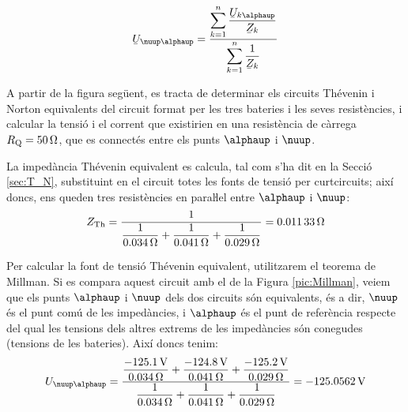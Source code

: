 \hfill
\begin{minipage}[b]{7cm}
    
    \label{pic:Millman}
\end{minipage}
\hfill
\begin{minipage}[b][4.5cm][t]{6cm}
    \begin{equation}
        \cmplx{U}_{\nuup\alphaup} = \frac{\displaystyle\sum_{k=1}^n \dfrac{\cmplx{U}_{k\alphaup}}{\cmplx{Z}_k}} {\displaystyle\sum_{k=1}^n \dfrac{1}{\cmplx{Z}_k}}
        \label{eq:millman}
    \end{equation}
\end{minipage}


\pagebreak

\begin{exemple}
    A partir de la figura següent, es tracta de determinar els circuits
    Thévenin i Norton equivalents del circuit format per les tres
    bateries i les seves resistències, i calcular la tensió i el
    corrent que existirien en una resistència de càrrega
    $R_\mathrm{Q}=\SI{50}{\ohm}$, que es connectés entre els punts $\alphaup$
    i $\nuup$.

    \begin{center}
        
    \end{center}

    La impedància Thévenin equivalent es calcula, tal com s'ha dit en la Secció \ref{sec:T_N},
    substituint en el circuit totes les fonts de tensió per curtcircuits; així doncs, ens
    queden tres resistències en paraŀlel entre $\alphaup$ i $\nuup$:
    \[
    Z_\mathrm{Th} = \frac{1}{\dfrac{1}{\SI{0,034}{\ohm}} +
    \dfrac{1}{\SI{0,041}{\ohm}} + \dfrac{1}{\SI{0,029}{\ohm}}} =
    \SI{0,01133}{\ohm}
    \]

    Per calcular la font de tensió Thévenin equivalent, utilitzarem el
    teorema de Millman. Si es compara aquest circuit amb el de la Figura
    \vref{pic:Millman}, veiem que els punts $\alphaup$ i $\nuup$ dels dos
    circuits són equivalents, és a dir, $\nuup$ és el punt comú de les
    impedàncies, i $\alphaup$ és el punt de referència respecte del qual les tensions  dels altres extrems de les impedàncies
    són conegudes
    (tensions de les bateries). Així doncs tenim:
    \[
    U_{\nuup\alphaup} = \frac{\dfrac{\SI{-125,1}{V}}{\SI{0,034}{\ohm}} +
    \dfrac{\SI{-124,8}{V}}{\SI{0,041}{\ohm}} +
    \dfrac{\SI{-125,2}{V}}{\SI{0,029}{\ohm}}}{\dfrac{1}{\SI{0,034}{\ohm}}
    + \dfrac{1}{\SI{0,041}{\ohm}} + \dfrac{1}{\SI{0,029}{\ohm}}} =
    \SI{-125,0562}{V}
    \]


\end{exemple}
